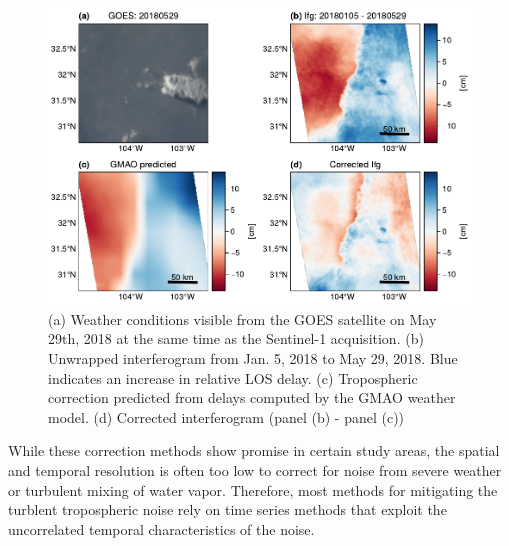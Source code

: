 \begin{figure}[!h]
	\centering
	\includegraphics[width=1.0\textwidth]{figures/chapter2-sar/figure_tropo_correct_wave.pdf}
	\caption[West Texas tropospheric correction attempt for pressure front]{
		(a) Weather conditions visible from the GOES satellite on May 29th, 2018 at the same time as the Sentinel-1 acquisition.
		(b) Unwrapped interferogram from Jan. 5, 2018 to May 29, 2018. Blue indicates an increase in relative LOS delay.
		(c) Tropospheric correction predicted from delays computed by the GMAO weather model.
		(d) Corrected interferogram (panel (b) - panel (c))
	}
	\label{fig:ch2-tropo-correct-wave}
\end{figure}

While these correction methods show promise in certain study areas, the spatial and temporal resolution is often too low to correct for noise from severe weather or turbulent mixing of water vapor. Therefore, most methods for mitigating the turblent tropospheric noise rely on time series methods that exploit the uncorrelated temporal characteristics of the noise.


%


